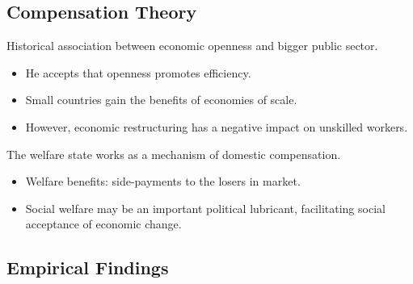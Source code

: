 \documentclass[
]{book}
\begin{document}
\hypertarget{compensation-theory}{%
\subsection{Compensation Theory}\label{compensation-theory}}

Historical association between economic openness and bigger public sector.

\begin{itemize}
\item
  He accepts that openness promotes efficiency.
\item
  Small countries gain the benefits of economies of scale.
\item
  However, economic restructuring has a negative impact on unskilled workers.
\end{itemize}

The welfare state works as a mechanism of domestic compensation.

\begin{itemize}
\item
  Welfare benefits: side-payments to the losers in market.
\item
  Social welfare may be an important political lubricant, facilitating social acceptance of economic change.
\end{itemize}

\hypertarget{empirical-findings}{%
\subsection{Empirical Findings}\label{empirical-findings}}
\end{document}
